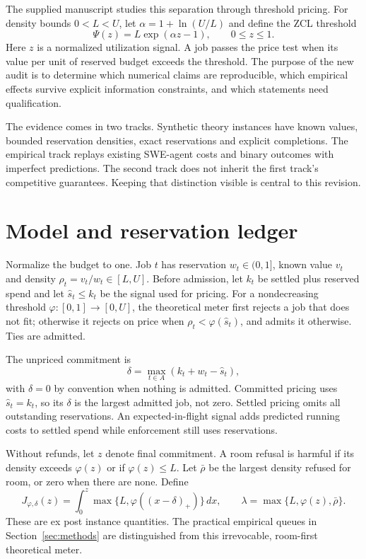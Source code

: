 \documentclass[11pt]{article}
\begin{document}
The supplied manuscript studies this separation through threshold pricing. For density bounds $0<L<U$, let $\alpha=1+\ln(U/L)$ and define the ZCL threshold
\[\Psi(z)=L\exp(\alpha z-1),\qquad 0\le z\le1.\]
Here $z$ is a normalized utilization signal. A job passes the price test when its value per unit of reserved budget exceeds the threshold. The purpose of the new audit is to determine which numerical claims are reproducible, which empirical effects survive explicit information constraints, and which statements need qualification.

The evidence comes in two tracks. Synthetic theory instances have known values, bounded reservation densities, exact reservations and explicit completions. The empirical track replays existing SWE-agent costs and binary outcomes with imperfect predictions. The second track does not inherit the first track's competitive guarantees. Keeping that distinction visible is central to this revision.

\section{Model and reservation ledger}
Normalize the budget to one. Job $t$ has reservation $w_t\in(0,1]$, known value $v_t$ and density $\rho_t=v_t/w_t\in[L,U]$. Before admission, let $k_t$ be settled plus reserved spend and let $\widehat s_t\le k_t$ be the signal used for pricing. For a nondecreasing threshold $\varphi:[0,1]\to[0,U]$, the theoretical meter first rejects a job that does not fit; otherwise it rejects on price when $\rho_t<\varphi(\widehat s_t)$, and admits it otherwise. Ties are admitted.

The unpriced commitment is
\[\delta=\max_{t\in A}(k_t+w_t-\widehat s_t),\]
with $\delta=0$ by convention when nothing is admitted. Committed pricing uses $\widehat s_t=k_t$, so its $\delta$ is the largest admitted job, not zero. Settled pricing omits all outstanding reservations. An expected-in-flight signal adds predicted running costs to settled spend while enforcement still uses reservations.

Without refunds, let $z$ denote final commitment. A room refusal is harmful if its density exceeds $\varphi(z)$ or if $\varphi(z)\le L$. Let $\bar\rho$ be the largest density refused for room, or zero when there are none. Define
\[J_{\varphi,\delta}(z)=\int_0^z\max\{L,\varphi((x-\delta)_+)\}\,dx,\qquad
\lambda=\max\{L,\varphi(z),\bar\rho\}.\]
These are ex post instance quantities. The practical empirical queues in Section~\ref{sec:methods} are distinguished from this irrevocable, room-first theoretical meter.
\end{document}
